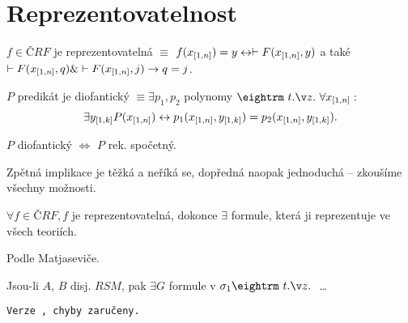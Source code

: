 \section{Reprezentovatelnost}

\dfn{} $f \in ČRF$ je reprezentovatelná $\equiv$ $f(x_{[1,n]} ) = y \leftrightarrow \vdash F( x_{[1,n]} , y)$ a také
$\vdash F(x_{[1,n]} , q) \& \vdash F(x_{[1,n]} , j) \rightarrow q = j$.

\dfn{} $P$ predikát je diofantický $\equiv \exists p_1, p_2$ polynomy $\st \forall \mls x n :$
$$ \exists y_{[1,k]} P(x_{[1,n]} ) \leftrightarrow p_1(x_{[1,n]} , y_{[1,k]} ) = p_2(x_{[1,n]} , y_{[1,k]} ).$$

 $P$ diofantický $\iff$ $P$ rek. spočetný.

\prf{} Zpětná implikace je těžká a neříká se, dopředná naopak jednoduchá -- zkoušíme všechny možnosti.

\thm{} $\forall f \in ČRF, f$ je reprezentovatelná, dokonce $\exists$ formule, která ji reprezentuje ve všech teoriích.

\prf{} Podle Matjaseviče.

\res{}  Jsou-li $A$, $B$ disj. $RSM$, pak $\exists G$ formule v $\sigma_1 \st$ \dots

{\tt Verze \versionnumber, chyby zaručeny.} 
\bye
